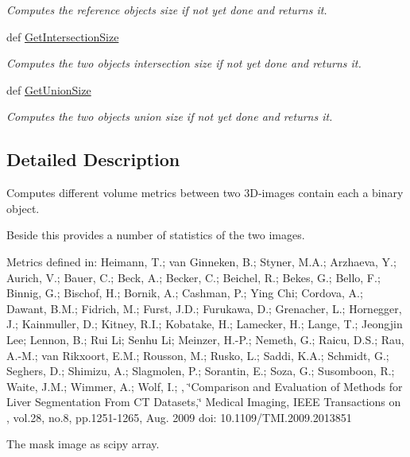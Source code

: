 \begin{DoxyCompactItemize}
\begin{DoxyCompactList}\small\item\em Computes the reference objects size if not yet done and returns it. \end{DoxyCompactList}\item 
\hypertarget{classmedpy_1_1metric_1_1volume_1_1Volume_a2740aebb1d3a30e50a4facb355bcf1a4}{
def \hyperlink{classmedpy_1_1metric_1_1volume_1_1Volume_a2740aebb1d3a30e50a4facb355bcf1a4}{GetIntersectionSize}}
\label{classmedpy_1_1metric_1_1volume_1_1Volume_a2740aebb1d3a30e50a4facb355bcf1a4}

\begin{DoxyCompactList}\small\item\em Computes the two objects intersection size if not yet done and returns it. \end{DoxyCompactList}\item 
\hypertarget{classmedpy_1_1metric_1_1volume_1_1Volume_ae8d79f3cbe067d886c4d1519c100a33a}{
def \hyperlink{classmedpy_1_1metric_1_1volume_1_1Volume_ae8d79f3cbe067d886c4d1519c100a33a}{GetUnionSize}}
\label{classmedpy_1_1metric_1_1volume_1_1Volume_ae8d79f3cbe067d886c4d1519c100a33a}

\begin{DoxyCompactList}\small\item\em Computes the two objects union size if not yet done and returns it. \end{DoxyCompactList}\end{DoxyCompactItemize}


\subsection{Detailed Description}
Computes different volume metrics between two 3D-\/images contain each a binary object. 

Beside this provides a number of statistics of the two images.

Metrics defined in: Heimann, T.; van Ginneken, B.; Styner, M.A.; Arzhaeva, Y.; Aurich, V.; Bauer, C.; Beck, A.; Becker, C.; Beichel, R.; Bekes, G.; Bello, F.; Binnig, G.; Bischof, H.; Bornik, A.; Cashman, P.; Ying Chi; Cordova, A.; Dawant, B.M.; Fidrich, M.; Furst, J.D.; Furukawa, D.; Grenacher, L.; Hornegger, J.; Kainmuller, D.; Kitney, R.I.; Kobatake, H.; Lamecker, H.; Lange, T.; Jeongjin Lee; Lennon, B.; Rui Li; Senhu Li; Meinzer, H.-\/P.; Nemeth, G.; Raicu, D.S.; Rau, A.-\/M.; van Rikxoort, E.M.; Rousson, M.; Rusko, L.; Saddi, K.A.; Schmidt, G.; Seghers, D.; Shimizu, A.; Slagmolen, P.; Sorantin, E.; Soza, G.; Susomboon, R.; Waite, J.M.; Wimmer, A.; Wolf, I.; , \char`\"{}Comparison and Evaluation of Methods for Liver Segmentation From CT Datasets,\char`\"{} Medical Imaging, IEEE Transactions on , vol.28, no.8, pp.1251-\/1265, Aug. 2009 doi: 10.1109/TMI.2009.2013851 \begin{DoxyVerb}The mask image as scipy array.\end{DoxyVerb}
 

